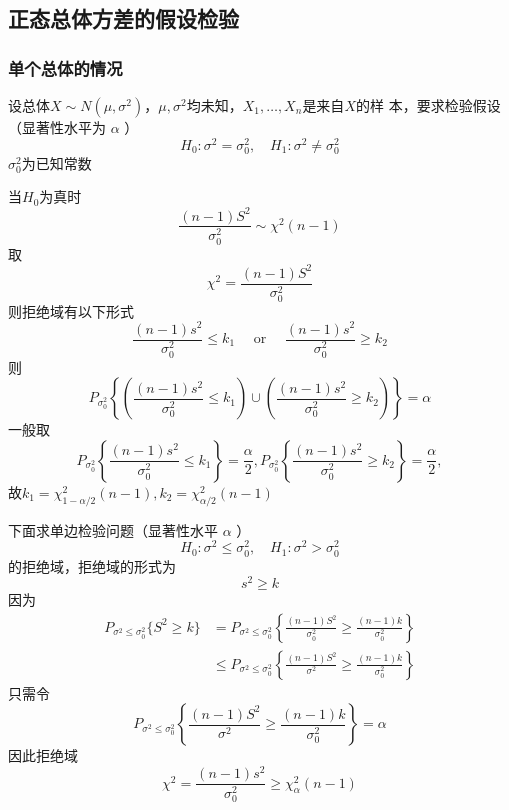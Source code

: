\documentclass[11pt]{article}
\begin{document}
\subsection{正态总体方差的假设检验}
\label{sec:org9f5b906}
\subsubsection{单个总体的情况}
\label{sec:org30ce0fa}
设总体\(X\sim N(\mu,\sigma^2)\)，\(\mu,\sigma^2\)均未知，\(X_1,\dots,X_n\)是来自\(X\)的样
本，要求检验假设（显著性水平为 \(\alpha\) ）
\begin{equation*}
H_0:\sigma^2=\sigma_0^2,\quad H_1:\sigma^2\neq\sigma_0^2
\end{equation*}
\(\sigma_0^2\)为已知常数

当\(H_0\)为真时
\begin{equation*}
\frac{(n-1)S^2}{\sigma^2_0}\sim\chi^2(n-1)
\end{equation*}
取
\begin{equation*}
\chi^2=\frac{(n-1)S^2}{\sigma_0^2}
\end{equation*}
则拒绝域有以下形式
\begin{equation*}
\frac{(n-1)s^2}{\sigma_0^2}\le k_1 \quad\text{ or }\quad
\frac{(n-1)s^2}{\sigma_0^2}\ge k_2
\end{equation*}
则
\begin{equation*}
P_{\sigma^2_0}\left\{
\left(\frac{(n-1)s^2}{\sigma_0^2}\le k_1\right)\cup
\left(\frac{(n-1)s^2}{\sigma_0^2}\ge k_2\right)
\right\}=\alpha
\end{equation*}
一般取
\begin{equation*}
P_{\sigma_0^2}\left\{\frac{(n-1)s^2}{\sigma_0^2}\le k_1\right\}=\frac{\alpha}{2},
P_{\sigma_0^2}\left\{\frac{(n-1)s^2}{\sigma_0^2}\ge k_2\right\}=\frac{\alpha}{2},
\end{equation*}
故\(k_1=\chi_{1-\alpha/2}^2(n-1),k_2=\chi_{\alpha/2}^2(n-1)\)

下面求单边检验问题（显著性水平 \(\alpha\) ）
\begin{equation*}
H_0:\sigma^2\le\sigma_0^2,\quad H_1:\sigma^2>\sigma_0^2
\end{equation*}
的拒绝域，拒绝域的形式为
\begin{equation*}
s^2\ge k
\end{equation*}
因为
\begin{align*}
P_{\sigma^2\le\sigma_0^2}\{S^2\ge k\}&=
P_{\sigma^2\le\sigma_0^2}\left\{
\frac{(n-1)S^2}{\sigma_0^2}\ge \frac{(n-1)k}{\sigma_0^2}
\right\}\\
&\le P_{\sigma^2\le\sigma_0^2}\left\{
\frac{(n-1)S^2}{\sigma^2}\ge \frac{(n-1)k}{\sigma_0^2}
\right\}
\end{align*}
只需令
\begin{equation*}
P_{\sigma^2\le\sigma_0^2}\left\{\frac{(n-1)S^2}{\sigma^2}\ge \frac{(n-1)k}{\sigma_0^2}
\right\}=\alpha
\end{equation*}
因此拒绝域
\begin{equation*}
\chi^2=\frac{(n-1)s^2}{\sigma_0^2}\ge\chi_{\alpha}^2(n-1)
\end{equation*}
\end{document}
